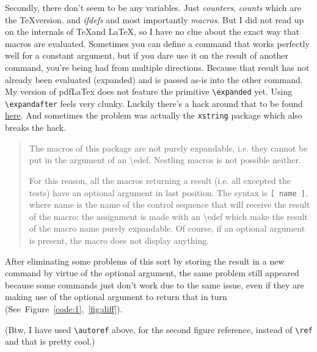\documentclass{article} \usepackage[utf8]{inputenc}
\begin{document}
Secondly, there don't seem to be any variables. Just \textit{counters}, \textit{counts} which are the \TeX version. and \textit{ifdefs} and most importantly \textit{macros}. But I did not read up on the internals of \TeX and \LaTeX, so I have no clue about the exact way that macros are evaluated. Sometimes you can define a command that works perfectly well for a constant argument, but if you dare use it on the result of another command, you're being had from multiple directions. Because that result has not already been evaluated (expanded) and is passed as-is into the other command. My version of pdfLaTex does not feature the primitive \texttt{\textbackslash expanded} yet. Using \texttt{\textbackslash expandafter} feels very clunky. Luckily there's a hack around that to be found \href{http://texhacks.blogspot.com/2010/12/forcing-full-expansion.html}{here}. And sometimes the problem was actually the \texttt{xstring} package which also breaks the hack.

\begin{samepage}
\begin{myquote}
\begin{quote}
The macros of this package are not purely expandable, i.e. they cannot be put in the argument of an \textbackslash edef. Nestling macros is not possible neither.

For this reason, all the macros returning a result (i.e. all excepted the tests) have an optional argument in last position. The syntax is \texttt{[ name ]}, where name is the name of the control sequence that will receive the result of the macro: the assignment is made with an \textbackslash edef which make the result of the macro name purely expandable. Of course, if an optional argument is present, the macro does not display anything.
\end{quote}
\end{myquote}
\end{samepage}

After eliminating some problems of this sort by storing the result in a new command by virtue of the optional argument, the same problem still appeared because some commands just don't work due to the same issue, even if they are making use of the optional argument to return that in turn \hbox{(See Figure \ref{code:1}, \autoref{fig:diff}).}

(Btw, I have used \texttt{\textbackslash autoref} above, for the second figure reference, instead of \texttt{\textbackslash ref} and that is pretty cool.)
\end{document}
